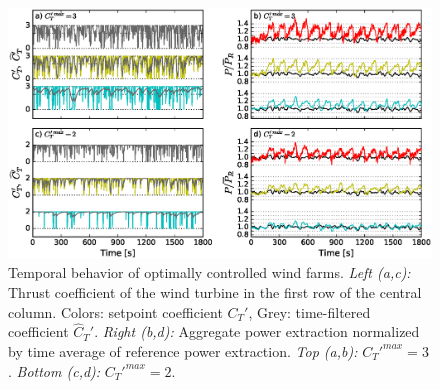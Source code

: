 \begin{figure}
	\centering
	\includegraphics[width=0.93\linewidth]{chapters/philtrans_torque/dynamics.eps}
	\caption{Temporal behavior of optimally controlled wind farms. 
		\emph{Left (a,c): } Thrust coefficient of the wind turbine in the first row of the central column. Colors: setpoint coefficient $C_T'$, Grey: time-filtered coefficient $\widehat{C}_T'$. \emph{Right (b,d): } Aggregate power extraction normalized by time average of reference power extraction. \emph{Top (a,b): } $C_T'^{max}=3$. \emph{Bottom (c,d): } $C_T'^{max} = 2$. \legendtauref \label{fig:time_control_and_time_power}}
\end{figure}

